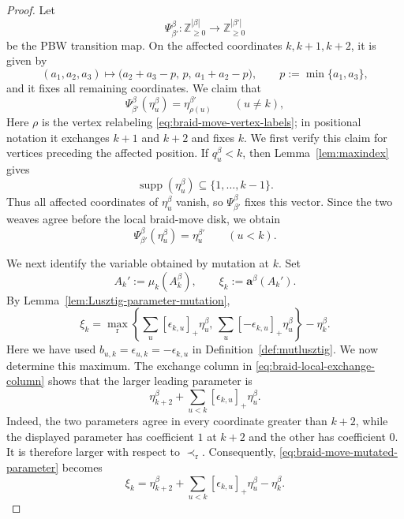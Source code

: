 \documentclass[12pt, reqno]{amsart}
\theoremstyle{plain}
\theoremstyle{definition}
\numberwithin{equation}{section}
\newcommand{\ZZ}{\mathbb{Z}}
\begin{document}
\begin{proof}
Let
\[
    \Psi_{\beta'}^\beta\colon
    \ZZ_{\geq0}^{|\beta|}
    \longrightarrow
    \ZZ_{\geq0}^{|\beta'|}
\]
be the PBW transition map. On the affected coordinates
\(k,k+1,k+2\), it is given by
\begin{equation}\label{eq:braid-move-PBW-transition}
    (a_1,a_2,a_3)
    \longmapsto
    \bigl(
        a_2+a_3-p,\,
        p,\,
        a_1+a_2-p
    \bigr),
    \qquad
    p:=\min\{a_1,a_3\},
\end{equation}
and it fixes all remaining coordinates. We claim that
\begin{equation}\label{eq:Psibetabeta'}
    \Psi_{\beta'}^\beta(\eta_u^\beta)
    =
    \eta_{\rho(u)}^{\beta'}
    \qquad (u\neq k),
\end{equation}
Here \(\rho\) is the vertex relabeling
\eqref{eq:braid-move-vertex-labels}; in positional notation it
exchanges \(k+1\) and \(k+2\) and fixes \(k\).
We first verify this claim for vertices preceding the affected
position. If \(q_u^\beta<k\), then Lemma~\ref{lem:maxindex} gives
\[
    \operatorname{supp}(\eta_u^\beta)
    \subseteq
    \{1,\ldots,k-1\}.
\]
Thus all affected coordinates of \(\eta_u^\beta\) vanish, so
\(\Psi_{\beta'}^\beta\) fixes this vector. Since the two weaves agree
before the local braid-move disk, we obtain
\begin{equation}\label{eq:earlier-eta-under-braid-transition}
    \Psi_{\beta'}^\beta(\eta_u^\beta)
    =
    \eta_{u}^{\beta'}
    \qquad (u<k).
\end{equation}

We next identify the variable obtained by mutation at \(k\). Set
\[
    A_k'
    :=
    \mu_k(A_k^\beta),
    \qquad
    \xi_k
    :=
    \mathbf a^\beta(A_k').
\]
By Lemma~\ref{lem:Lusztig-parameter-mutation},
\begin{equation}\label{eq:braid-move-mutated-parameter}
    \xi_k
    =
    \max_{\mathrm r}
    \left\{
        \sum_u[\epsilon_{k,u}]_+\eta_u^\beta,\,
        \sum_u[-\epsilon_{k,u}]_+\eta_u^\beta
    \right\}
    -
    \eta_k^\beta.
\end{equation}
Here we have used
\(
    b_{u,k}=\epsilon_{u,k}=-\epsilon_{k,u}
\)
in Definition~\ref{def:mutlusztig}.
We now determine this maximum. The exchange column in
\eqref{eq:braid-local-exchange-column} shows that the larger leading
parameter is
\[
    \eta_{k+2}^\beta
    +
    \sum_{u<k}[\epsilon_{k,u}]_+\eta_u^\beta.
\]
Indeed, the two parameters agree in every coordinate greater than
\(k+2\), while the displayed parameter has coefficient \(1\) at
\(k+2\) and the other has coefficient \(0\). It is therefore larger
with respect to \(\prec_{\mathrm r}\). Consequently,
\eqref{eq:braid-move-mutated-parameter} becomes
\begin{equation}\label{eq:explicit-mutated-parameter}
    \xi_k
    =
    \eta_{k+2}^\beta
    +
    \sum_{u<k}[\epsilon_{k,u}]_+\eta_u^\beta
    -
    \eta_k^\beta.
\end{equation}


\end{proof}
\end{document}
